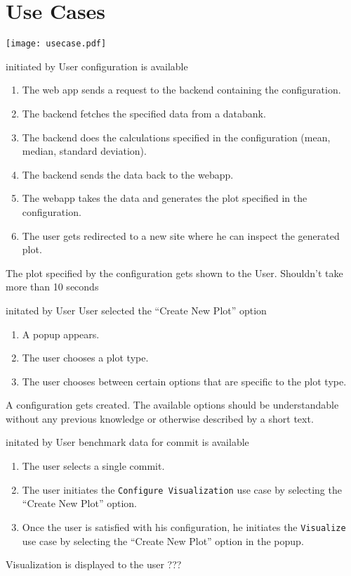\section{Use Cases}

\texttt{[image: usecase.pdf]}

{initiated by User}
{\gls{configuration} is available}
{\begin{enumerate}
    \item The web app sends a request to the backend containing the \gls{configuration}.
    \item The backend fetches the specified data from a databank.
    \item The backend does the calculations specified in the \gls{configuration} (mean, median, standard deviation).
    \item The backend sends the data back to the webapp.
    \item The webapp takes the data and generates the plot specified in the \gls{configuration}.
    \item The user gets redirected to a new site where he can inspect the generated plot.
\end{enumerate}}
{The plot specified by the \gls{configuration} gets shown to the User.}
{Shouldn't take more than 10 seconds}

\bigskip

{initated by User}
{User selected the \enquote{Create New Plot} option}
{\begin{enumerate}
    \item A popup appears.
    \item The user chooses a plot type.
    \item The user chooses between certain options that are specific to the plot type.
\end{enumerate}}
{A \gls{configuration} gets created.}
{The available options should be understandable without any previous knowledge or otherwise described by a short text.}

\bigskip

{initated by User}
{benchmark data for commit is available}
{\begin{enumerate}
    \item The user selects a single commit.
    \item The user initiates the \texttt{Configure Visualization} use case by selecting the \enquote{Create New Plot} option.
    \item Once the user is satisfied with his \gls{configuration}, he initiates the \texttt{Visualize} use case by selecting the \enquote{Create New Plot} option in the popup.
\end{enumerate}}
{Visualization is displayed to the user}
{???}

